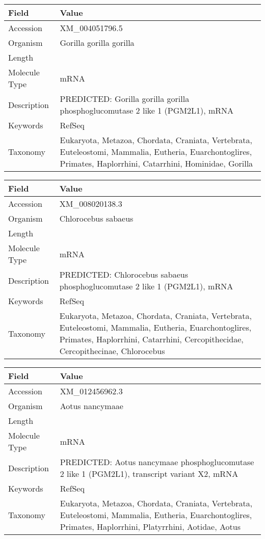 \documentclass[10pt]{article}
\begin{document}
{\footnotesize
\begin{longtable}{>{\raggedright\arraybackslash}p{4.5cm} >{\raggedright\arraybackslash}p{11.5cm}}
\textbf{Field} & \textbf{Value} \\
\hline
Accession & XM\_004051796.5 \\
Organism & Gorilla gorilla gorilla \\
Length & 3083 \\
Molecule Type & mRNA \\
Description & PREDICTED: Gorilla gorilla gorilla phosphoglucomutase 2 like 1 (PGM2L1), mRNA \\
Keywords & RefSeq \\
Taxonomy & Eukaryota, Metazoa, Chordata, Craniata, Vertebrata, Euteleostomi, Mammalia, Eutheria, Euarchontoglires, Primates, Haplorrhini, Catarrhini, Hominidae, Gorilla \\
\end{longtable}
}

{\footnotesize
\begin{longtable}{>{\raggedright\arraybackslash}p{4.5cm} >{\raggedright\arraybackslash}p{11.5cm}}
\textbf{Field} & \textbf{Value} \\
\hline
Accession & XM\_008020138.3 \\
Organism & Chlorocebus sabaeus \\
Length & 6703 \\
Molecule Type & mRNA \\
Description & PREDICTED: Chlorocebus sabaeus phosphoglucomutase 2 like 1 (PGM2L1), mRNA \\
Keywords & RefSeq \\
Taxonomy & Eukaryota, Metazoa, Chordata, Craniata, Vertebrata, Euteleostomi, Mammalia, Eutheria, Euarchontoglires, Primates, Haplorrhini, Catarrhini, Cercopithecidae, Cercopithecinae, Chlorocebus \\
\end{longtable}
}

{\footnotesize
\begin{longtable}{>{\raggedright\arraybackslash}p{4.5cm} >{\raggedright\arraybackslash}p{11.5cm}}
\textbf{Field} & \textbf{Value} \\
\hline
Accession & XM\_012456962.3 \\
Organism & Aotus nancymaae \\
Length & 4402 \\
Molecule Type & mRNA \\
Description & PREDICTED: Aotus nancymaae phosphoglucomutase 2 like 1 (PGM2L1), transcript variant X2, mRNA \\
Keywords & RefSeq \\
Taxonomy & Eukaryota, Metazoa, Chordata, Craniata, Vertebrata, Euteleostomi, Mammalia, Eutheria, Euarchontoglires, Primates, Haplorrhini, Platyrrhini, Aotidae, Aotus \\
\end{longtable}
}
\end{document}
